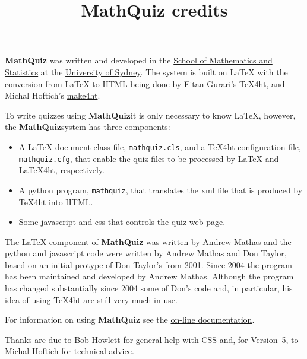 \documentclass{mathquiz}
\title{MathQuiz credits}
\newcommand{\MathQuiz}{\textbf{MathQuiz}}
\begin{document}
\begin{discussion}[Credits]
    \MathQuiz{} was written and developed in the
    \href{http://www.maths.usyd.edu.au/}{School of Mathematics and
    Statistics} at the \href{http://www.usyd.edu.au/}{University of
    Sydney}.  The system is built on \LaTeX{} with the conversion from
    \LaTeX{} to HTML being done by Eitan Gurari's
    \href{http://www.cis.ohio-state.edu/~gurari/TeX4ht/mn.html}{TeX4ht},
    and Michal Hoftich's
    \href{https://github.com/michal-h21/make4ht}{make4ht}.

    To write quizzes using \MathQuiz it is only necessary to know
    \LaTeX, however, the \MathQuiz system has three components:
    \begin{itemize}
      \item A \LaTeX{} document class file, \texttt{mathquiz.cls}, and
      a \TeX 4ht configuration file, \texttt{mathquiz.cfg}, that enable the
      quiz files to be processed by \LaTeX{} and \LaTeX 4ht,
      respectively.
      \item A python program, \texttt{mathquiz}, that translates the xml
      file that is produced by \TeX 4ht into  HTML.
      \item Some javascript and css that controls the quiz web page.
    \end{itemize}

   The \LaTeX{} component of \MathQuiz{} was written by Andrew Mathas
   and the python and javascript code were written by Andrew Mathas and
   Don Taylor, based on an initial protype of Don Taylor's from 2001.
   Since 2004 the program has been maintained and developed by Andrew
   Mathas. Although the program has changed substantially since 2004
   some of Don's code and, in particular, his idea of using \TeX 4ht are
   still very much in use.

   For information on using \MathQuiz{} see the
   \href{http://www.math.usyd.edu.au/u/MOW/MathQuiz/doc/mathquiz-manual.html}{on-line documentation}.

   Thanks are due to Bob Howlett for general help with CSS and, for
   Version~5, to  Michal Hoftich for technical advice.
\end{discussion}
\end{document}
